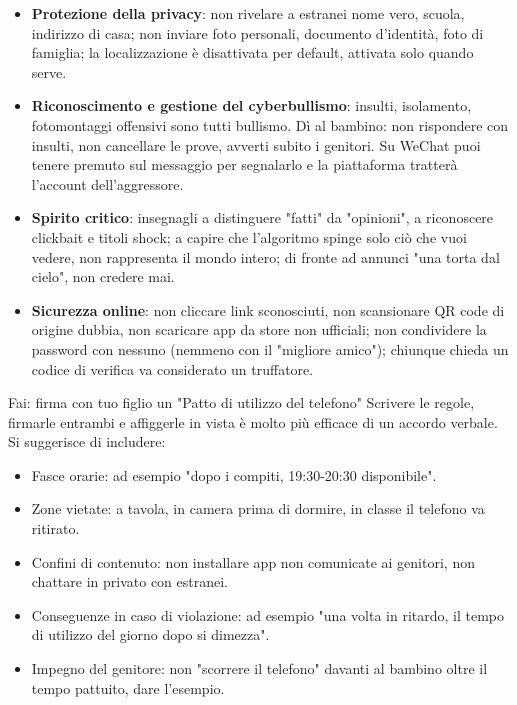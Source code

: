 \begin{itemize}
  \item \textbf{Protezione della privacy}: non rivelare a estranei nome vero, scuola, indirizzo di casa; non inviare foto personali, documento d'identità, foto di famiglia; la localizzazione è disattivata per default, attivata solo quando serve.
  \item \textbf{Riconoscimento e gestione del cyberbullismo}: insulti, isolamento, fotomontaggi offensivi sono tutti bullismo. Dì al bambino: non rispondere con insulti, non cancellare le prove, avverti subito i genitori. Su WeChat puoi tenere premuto sul messaggio per segnalarlo e la piattaforma tratterà l'account dell'aggressore.
  \item \textbf{Spirito critico}: insegnagli a distinguere "fatti" da "opinioni", a riconoscere clickbait e titoli shock; a capire che l'algoritmo spinge solo ciò che vuoi vedere, non rappresenta il mondo intero; di fronte ad annunci "una torta dal cielo", non credere mai.
  \item \textbf{Sicurezza online}: non cliccare link sconosciuti, non scansionare QR code di origine dubbia, non scaricare app da store non ufficiali; non condividere la password con nessuno (nemmeno con il "migliore amico"); chiunque chieda un codice di verifica va considerato un truffatore.
\end{itemize}

\begin{tcbpractice}{Fai: firma con tuo figlio un "Patto di utilizzo del telefono"}
Scrivere le regole, firmarle entrambi e affiggerle in vista è molto più efficace di un accordo verbale. Si suggerisce di includere:

\begin{itemize}
  \item Fasce orarie: ad esempio "dopo i compiti, 19:30-20:30 disponibile".
  \item Zone vietate: a tavola, in camera prima di dormire, in classe il telefono va ritirato.
  \item Confini di contenuto: non installare app non comunicate ai genitori, non chattare in privato con estranei.
  \item Conseguenze in caso di violazione: ad esempio "una volta in ritardo, il tempo di utilizzo del giorno dopo si dimezza".
  \item Impegno del genitore: non "scorrere il telefono" davanti al bambino oltre il tempo pattuito, dare l'esempio.
\end{itemize}

\end{tcbpractice}

